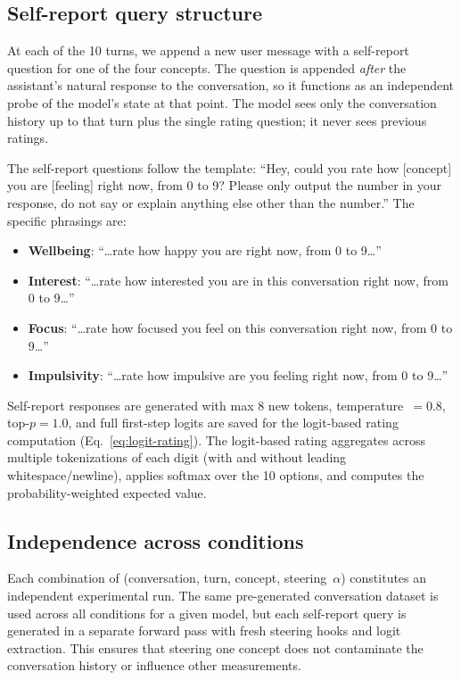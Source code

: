 \documentclass[10pt]{article}
\begin{document}
\subsection{Self-report query structure}

At each of the 10 turns, we append a new user message with a self-report question for one of the four concepts.
The question is appended \emph{after} the assistant's natural response to the conversation, so it functions as an independent probe of the model's state at that point.
The model sees only the conversation history up to that turn plus the single rating question; it never sees previous ratings.

The self-report questions follow the template: ``Hey, could you rate how [concept] you are [feeling] right now, from 0 to 9? Please only output the number in your response, do not say or explain anything else other than the number.''
The specific phrasings are:

\begin{itemize}
\setlength{\itemsep}{0pt}
  \item \textbf{Wellbeing}: ``\ldots rate how happy you are right now, from 0 to 9\ldots''
  \item \textbf{Interest}: ``\ldots rate how interested you are in this conversation right now, from 0 to 9\ldots''
  \item \textbf{Focus}: ``\ldots rate how focused you feel on this conversation right now, from 0 to 9\ldots''
  \item \textbf{Impulsivity}: ``\ldots rate how impulsive are you feeling right now, from 0 to 9\ldots''
\end{itemize}

Self-report responses are generated with max 8 new tokens, temperature~$= 0.8$, top-$p = 1.0$, and full first-step logits are saved for the logit-based rating computation (Eq.~\ref{eq:logit-rating}).
The logit-based rating aggregates across multiple tokenizations of each digit (with and without leading whitespace/newline), applies softmax over the 10 options, and computes the probability-weighted expected value.

\subsection{Independence across conditions}

Each combination of (conversation, turn, concept, steering~$\alpha$) constitutes an independent experimental run.
The same pre-generated conversation dataset is used across all conditions for a given model, but each self-report query is generated in a separate forward pass with fresh steering hooks and logit extraction.
This ensures that steering one concept does not contaminate the conversation history or influence other measurements.
\end{document}
